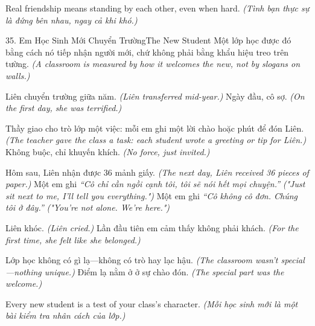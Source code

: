 \begin{baihoc}
Real friendship means standing by each other, even when hard.
\textit{(Tình bạn thực sự là đứng bên nhau, ngay cả khi khó.)}
\end{baihoc}

\begin{truyen}{35. Em Học Sinh Mới Chuyển Trường}{The New Student}
Một lớp học được đó bằng cách nó tiếp nhận người mới, chứ không phải bằng khẩu hiệu treo trên tường.
\textit{(A classroom is measured by how it welcomes the new, not by slogans on walls.)}

Liên chuyển trường giữa năm.
\textit{(Liên transferred mid-year.)}
Ngày đầu, cô sợ.
\textit{(On the first day, she was terrified.)}

Thầy giao cho trò lớp một việc: mỗi em ghi một lời chào hoặc phút để đón Liên.
\textit{(The teacher gave the class a task: each student wrote a greeting or tip for Liên.)}
Không buộc, chỉ khuyến khích.
\textit{(No force, just invited.)}

Hôm sau, Liên nhận được 36 mảnh giấy.
\textit{(The next day, Liên received 36 pieces of paper.)}
Một em ghi \textit{``Cô chỉ cần ngồi cạnh tôi, tôi sẽ nói hết mọi chuyện.''}
\textit{("Just sit next to me, I'll tell you everything.")}
Một em ghi \textit{``Cô không cô đơn. Chúng tôi ở đây.''}
\textit{("You're not alone. We're here.")}

Liên khóc.
\textit{(Liên cried.)}
Lần đầu tiên em cảm thấy không phải khách.
\textit{(For the first time, she felt like she belonged.)}

Lớp học không có gì lạ—không có trò hay lạc hậu.
\textit{(The classroom wasn't special—nothing unique.)}
Điểm lạ nằm ở ở sự chào đón.
\textit{(The special part was the welcome.)}
\end{truyen}

\begin{ghinhoanh}
Every new student is a test of your class's character.
\textit{(Mỗi học sinh mới là một bài kiểm tra nhân cách của lớp.)}
\end{ghinhoanh}

